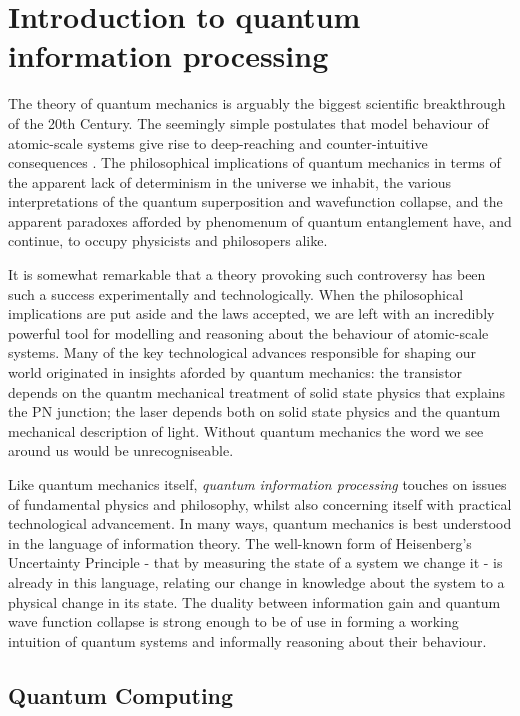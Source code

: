 \chapter{Introduction to quantum information processing} 
\label{ch:Introduction}

The theory of quantum mechanics is arguably the biggest scientific breakthrough of the 20th Century. The seemingly simple postulates that model behaviour of atomic-scale systems give rise to deep-reaching and counter-intuitive consequences .
The philosophical implications of quantum mechanics in terms of the apparent lack of determinism in the universe we inhabit, the various interpretations of the quantum superposition and wavefunction collapse, and the apparent paradoxes afforded by phenomenum of quantum entanglement have, and continue, to occupy physicists and philosopers alike.

It is somewhat remarkable that a theory provoking such controversy has been such a success experimentally and technologically. When the philosophical implications are put aside and the laws accepted, we are left with an incredibly powerful tool for modelling and reasoning about the behaviour of atomic-scale systems. Many of the key technological advances responsible for shaping our world originated in insights aforded by quantum mechanics: the transistor depends on the quantm mechanical treatment of solid state physics that explains the PN junction; the laser depends both on solid state physics and the quantum mechanical description of light. Without quantum mechanics the word we see around us would be unrecogniseable.

Like quantum mechanics itself, \textit{quantum information processing} touches on issues of fundamental physics and philosophy, whilst also concerning itself with practical technological advancement. In many ways, quantum mechanics is best understood in the language of information theory. The well-known form of Heisenberg's Uncertainty Principle - that by measuring the state of a system we change it - is already in this language, relating our change in knowledge about the system to a physical change in its state. The duality between information gain and quantum wave function collapse is strong enough to be of use in forming a working intuition of quantum systems and informally reasoning about their behaviour.

\section{Quantum Computing}

